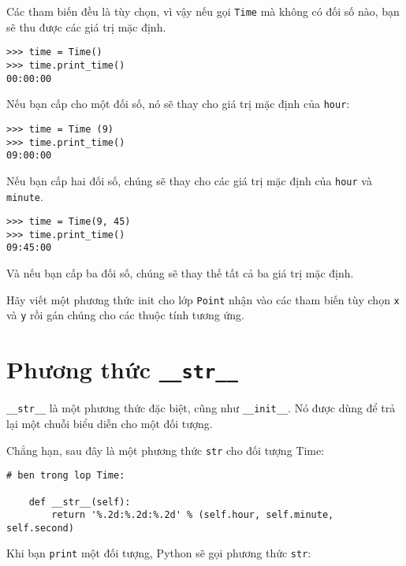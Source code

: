 \documentclass[11pt]{book}
\begin{document}

Các tham biến đều là tùy chọn, vì vậy nếu gọi {\tt Time} mà
không có đối số nào, bạn sẽ thu được các giá trị mặc định.

\beforeverb
\begin{verbatim}
>>> time = Time()
>>> time.print_time()
00:00:00
\end{verbatim}
\afterverb
%
Nếu bạn cấp cho một đối số, nó sẽ thay cho giá trị mặc định
của {\tt hour}:

\beforeverb
\begin{verbatim}
>>> time = Time (9)
>>> time.print_time()
09:00:00
\end{verbatim}
\afterverb
%
Nếu bạn cấp hai đối số, chúng sẽ thay cho các giá trị mặc định
của {\tt hour} và {\tt minute}.

\beforeverb
\begin{verbatim}
>>> time = Time(9, 45)
>>> time.print_time()
09:45:00
\end{verbatim}
\afterverb
%
Và nếu bạn cấp ba đối số, chúng sẽ thay thế tất cả ba giá trị
mặc định.


\begin{ex}

Hãy viết một phương thức init cho lớp {\tt Point} nhận vào các
tham biến tùy chọn {\tt x} và {\tt y} rồi gán chúng cho các 
thuộc tính tương ứng.
\end{ex}


\section{Phương thức {\tt \_\_str\_\_}}


\verb"__str__" là một phương thức đặc biệt, cũng như \verb"__init__".
Nó được dùng để trả lại một chuỗi biểu diễn cho một đối tượng.


Chẳng hạn, sau đây là một phương thức {\tt str} cho đối tượng Time:

\beforeverb
\begin{verbatim}
# ben trong lop Time:

    def __str__(self):
        return '%.2d:%.2d:%.2d' % (self.hour, self.minute, self.second)
\end{verbatim}
\afterverb
%
Khi bạn {\tt print} một đối tượng, Python sẽ gọi phương thức {\tt str}:
\end{document}
